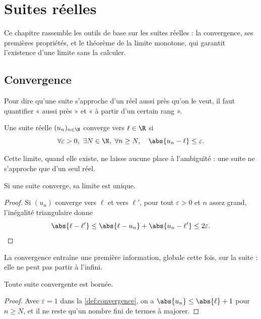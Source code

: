 \chapter{Suites réelles}%

Ce chapitre rassemble les outils de base sur les suites réelles : la
convergence, ses premières propriétés, et le théorème de la limite monotone,
qui garantit l'existence d'une limite sans la calculer.

\section{Convergence}%

Pour dire qu'une suite s'approche d'un réel aussi près qu'on le veut, il
faut quantifier « aussi près » et « à partir d'un certain rang ».

\begin{definition}[title=Suite convergente, label=def:convergence]
    Une suite réelle $(u_n)_{n \in \N}$ converge vers $\ell \in \R$ si
    \[
        \forall \varepsilon > 0,\ \exists N \in \N,\ \forall n \ge N,\quad
        \abs{u_n - \ell} \le \varepsilon.
    \]
\end{definition}

Cette limite, quand elle existe, ne laisse aucune place à l'ambiguïté : une
suite ne s'approche que d'un seul réel.

\begin{theorem}[title=Unicité de la limite]
    Si une suite converge, sa limite est unique.
\end{theorem}

\begin{proof}
    Si $(u_n)$ converge vers $\ell$ et vers $\ell'$, pour tout
    $\varepsilon > 0$ et $n$ assez grand, l'inégalité triangulaire donne
    \[
        \abs{\ell - \ell'} \le \abs{\ell - u_n} + \abs{u_n - \ell'} \le 2\varepsilon. \qedhere
    \]
\end{proof}

La convergence entraîne une première information, globale cette fois, sur
la suite : elle ne peut pas partir à l'infini.

\begin{proposition}[label=prop:bornee]
    Toute suite convergente est bornée.
\end{proposition}

\begin{proof}
    Avec $\varepsilon = 1$ dans la \cref{def:convergence}, on a
    $\abs{u_n} \le \abs{\ell} + 1$ pour $n \ge N$, et il ne reste qu'un
    nombre fini de termes à majorer. \qedhere
\end{proof}

